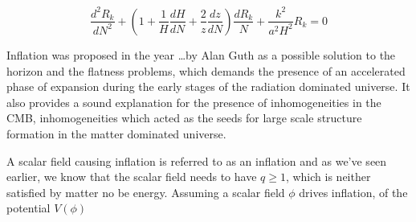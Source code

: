 \documentclass[12pt, a4paper]{report}
\begin{document}
$$\frac{d^2R_k}{dN^2} + (1 + \frac{1}{H}\frac{dH}{dN} + \frac{2}{z}\frac{dz}{dN})\frac{dR_k}{N} +\frac{k^2}{a^2H^2}R_k = 0$$

\newpage

Inflation was proposed in the year \ldots by Alan Guth as a possible solution to the horizon and the flatness problems, which demands the presence of an accelerated phase of expansion during the early stages of the radiation dominated universe. It also provides a sound explanation for the presence of inhomogeneities in the CMB, inhomogeneities which acted as the seeds for large scale structure formation in the matter dominated universe.

A scalar field causing inflation is referred to as an inflation and as we've seen earlier, we know that the scalar field needs to have $q \geq 1$, which is neither satisfied by matter no be energy. Assuming a scalar field $\phi$ drives inflation, of the potential $V(\phi)$
\end{document}
